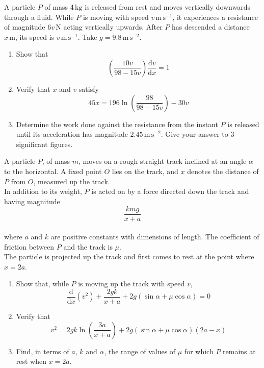 \documentclass[leqno]{article}
\begin{document}
\begin{enumerate}[
  label=\textbf{\arabic*.},
  leftmargin=*,
  topsep=0pt,
  partopsep=0pt,
  parsep=0pt
]
\newpage

\questionitem

A particle $P$ of mass $4\,\mathrm{kg}$ is released from rest and moves vertically downwards through a fluid. While $P$ is moving with speed $v\,\mathrm{m\,s^{-1}}$, it experiences a resistance of magnitude $6v\,\mathrm{N}$ acting vertically upwards. After $P$ has descended a distance $x\,\mathrm{m}$, its speed is $v\,\mathrm{m\,s^{-1}}$. Take $g=9.8\,\mathrm{m\,s^{-2}}$. \\

\begin{enumerate}[label=\textbf{(\alph*)}]
  \item Show that
  \[
  \left(\frac{10v}{98-15v}\right)\frac{\mathrm{d}v}{\mathrm{d}x}=1
  \]
  \item Verify that $x$ and $v$ satisfy
  \[
  45x=196\ln\left(\frac{98}{98-15v}\right)-30v
  \]
  \item Determine the work done against the resistance from the instant $P$ is released until its acceleration has magnitude $2.45\,\mathrm{m\,s^{-2}}$. Give your answer to $3$ significant figures.  \\
\end{enumerate}

\newpage

\questionitem

A particle $P$, of mass $m$, moves on a rough straight track inclined at an angle $\alpha$ to the horizontal. A fixed point $O$ lies on the track, and $x$ denotes the distance of $P$ from $O$, measured up the track. \\

In addition to its weight, $P$ is acted on by a force directed down the track and having magnitude
\[
\frac{kmg}{x+a}
\] \\
where $a$ and $k$ are positive constants with dimensions of length. The coefficient of friction between $P$ and the track is $\mu$. \\

The particle is projected up the track and first comes to rest at the point where $x=2a$. \\

\begin{enumerate}[label=\textbf{(\alph*)}]
  \item Show that, while $P$ is moving up the track with speed $v$,
  \[
  \frac{\mathrm{d}}{\mathrm{d}x}(v^2)+\frac{2gk}{x+a}+2g(\sin\alpha+\mu\cos\alpha)=0
  \]
  \item Verify that
  \[
  v^2=2gk\ln\left(\frac{3a}{x+a}\right)+2g(\sin\alpha+\mu\cos\alpha)(2a-x)
  \]
  \item Find, in terms of $a$, $k$ and $\alpha$, the range of values of $\mu$ for which $P$ remains at rest when $x=2a$.  \\
\end{enumerate}


\end{enumerate}
\end{document}
